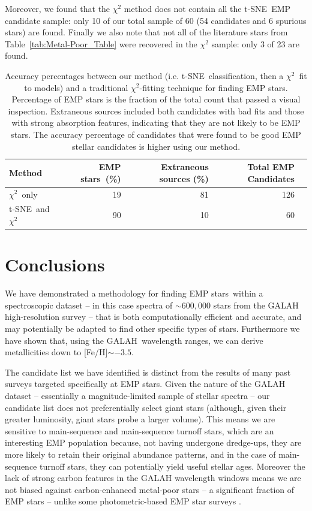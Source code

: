 \documentclass[]{aastex631}
\newcommand{\g}{GALAH\xspace}
\newcommand{\ts}{t-SNE\xspace}
\newcommand{\emp}{EMP star\xspace}
\newcommand{\emps}{EMP stars\xspace}
\newcommand{\feh}{[Fe/H]\xspace}
\newcommand{\ci}{$\chi^2$\xspace}
\begin{document}
Moreover, we found that the \ci method does not contain all the \ts~EMP candidate sample: only 10 of our total sample of 60 (54 candidates and 6 spurious stars)
are found. Finally we also note that not all of the literature stars from Table~\ref{tab:Metal-Poor_Table} were recovered in the \ci sample: only 3 of 23 are found.

\begin{table}
    \begin{tabular}{@{}lrrrl@{}}
    \hline
   Method   & \ \emps \ (\%) & Extraneous sources (\%) & Total EMP Candidates \\
    \hline
    \hline
    \ci \ only  &  19 & 81  & 126  \\
    \ts \ and \ci & 90 & 10  &  60
    \end{tabular}
    \caption{Accuracy percentages between our method (i.e. \ts\ classification, then a \ci \ fit to models) and a traditional \ci-fitting technique for finding \emps. Percentage of EMP stars is the fraction of the total count that passed a visual inspection. Extraneous sources included both candidates with bad fits and those with strong absorption features, indicating that they are not likely to be \emps. The accuracy percentage of candidates that were found to be good EMP stellar candidates is higher using our method.}
    \label{tab:Candidate Counts}
\end{table}

\section{Conclusions}\label{Sec:Conclusions}

We have demonstrated a methodology for finding \emps \ within a spectroscopic dataset -- in this case spectra of $\sim 600,000$ stars from the \g high-resolution survey -- that is both computationally efficient and accurate, and may potentially be adapted to find other specific types of stars. Furthermore we have shown that, using the \g \ wavelength ranges, we can derive metallicities down to \feh $\sim  -3.5$. 

The candidate list we have identified is distinct from the results of many past surveys targeted specifically at \emps \citep[e.g.,][]{Da_Costa_2019,Starkenburg2017}. Given the nature of the \g dataset -- essentially a magnitude-limited sample of stellar spectra -- our candidate list does not preferentially select giant stars (although, given their greater luminosity, giant stars probe a larger volume). This means we are sensitive to main-sequence and main-sequence turnoff stars, which are an interesting EMP population because, not having undergone dredge-ups, they are more likely to retain their original abundance patterns, and in the case of main-sequence turnoff stars, they can potentially yield useful stellar ages. Moreover the lack of strong carbon features in the \g wavelength windows means we are not biased against carbon-enhanced metal-poor stars -- a significant fraction of \emps \citep{Yong2013,2013AJ....146..132L} -- unlike some photometric-based \emp surveys \citep[cf.][]{Da_Costa_2019}.
\end{document}
